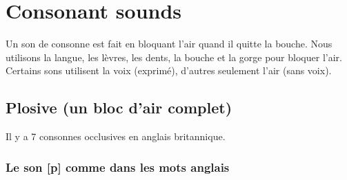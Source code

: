 \documentclass[12pt,a4paper]{book}
\begin{document}
\chapter{\textenglish{Consonant sounds}}
\label{sec:org7af88d6}
Un son de consonne est fait en bloquant l'air quand il quitte la bouche. Nous utilisons la langue, les lèvres, les dents, la bouche et la gorge pour bloquer l'air. Certains sons utilisent la voix (exprimé), d'autres seulement l'air (sans voix).
\section{Plosive (un bloc d'air complet)}
\label{sec:orga048006}
Il y a 7 consonnes occlusives en anglais britannique.  
\subsection{Le son [p] comme dans les mots anglais}
\label{sec:orge071836}
\end{document}
